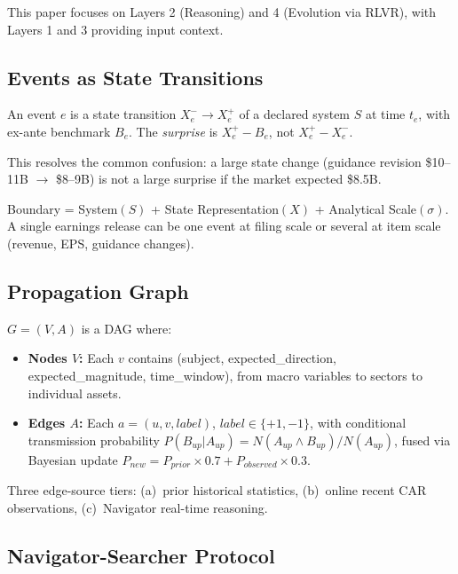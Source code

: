 \documentclass[sigconf, anonymous, review]{acmart}
\begin{document}
This paper focuses on Layers 2 (Reasoning) and 4 (Evolution via RLVR), with Layers 1 and 3 providing input context.

\subsection{Events as State Transitions}

\begin{definition}[Event]
An event $e$ is a state transition $X_e^- \to X_e^+$ of a declared system $S$ at time $t_e$, with ex-ante benchmark $B_e$. The \emph{surprise} is $X_e^+ - B_e$, not $X_e^+ - X_e^-$.
\end{definition}

This resolves the common confusion: a large state change (guidance revision \$10--11B $\to$ \$8--9B) is not a large surprise if the market expected \$8.5B.

\begin{definition}
Boundary = System$(S)$ + State Representation$(X)$ + Analytical Scale$(\sigma)$. A single earnings release can be one event at filing scale or several at item scale (revenue, EPS, guidance changes).
\end{definition}

\subsection{Propagation Graph}

$G = (V, A)$ is a DAG where:
\begin{itemize}
    \item \textbf{Nodes $V$:} Each $v$ contains (subject, expected\_direction, expected\_magnitude, time\_window), from macro variables to sectors to individual assets.
    \item \textbf{Edges $A$:} Each $a = (u,v,label)$, $label \in \{+1, -1\}$, with conditional transmission probability $P(B_{up}|A_{up}) = N(A_{up} \wedge B_{up})/N(A_{up})$, fused via Bayesian update $P_{new} = P_{prior} \times 0.7 + P_{observed} \times 0.3$.
\end{itemize}

Three edge-source tiers: (a)~prior historical statistics, (b)~online recent CAR observations, (c)~Navigator real-time reasoning.

\subsection{Navigator-Searcher Protocol}
\end{document}
